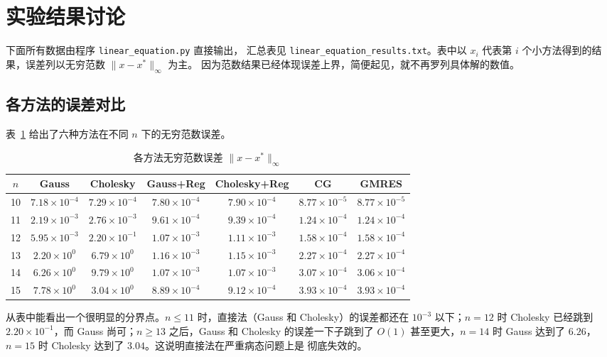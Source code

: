 \documentclass[UTF8]{ctexart}
\begin{document}
\section{实验结果讨论}

下面所有数据由程序 \texttt{linear\_equation.py} 直接输出，
汇总表见 \texttt{linear\_equation\_results.txt}。表中以 $x_i$ 代表第 $i$
个小方法得到的结果，误差列以无穷范数 $\|x-x^*\|_\infty$ 为主。
因为范数结果已经体现误差上界，简便起见，就不再罗列具体解的数值。

\subsection{各方法的误差对比}

表~\ref{tab:err} 给出了六种方法在不同 $n$ 下的无穷范数误差。

\begin{table}[H]
\centering
\small
\caption{各方法无穷范数误差 $\|x-x^*\|_\infty$}
\label{tab:err}
\begin{tabular}{c|cccccc}
\toprule
$n$ & Gauss & Cholesky & Gauss+Reg & Cholesky+Reg & CG & GMRES \\
\midrule
10 & $7.18\times 10^{-4}$ & $7.29\times 10^{-4}$ & $7.80\times 10^{-4}$ & $7.90\times 10^{-4}$ & $8.77\times 10^{-5}$ & $8.77\times 10^{-5}$ \\
11 & $2.19\times 10^{-3}$ & $2.76\times 10^{-3}$ & $9.61\times 10^{-4}$ & $9.39\times 10^{-4}$ & $1.24\times 10^{-4}$ & $1.24\times 10^{-4}$ \\
12 & $5.95\times 10^{-3}$ & $2.20\times 10^{-1}$ & $1.07\times 10^{-3}$ & $1.11\times 10^{-3}$ & $1.58\times 10^{-4}$ & $1.58\times 10^{-4}$ \\
13 & $2.20\times 10^{0}$  & $6.79\times 10^{0}$  & $1.16\times 10^{-3}$ & $1.15\times 10^{-3}$ & $2.27\times 10^{-4}$ & $2.27\times 10^{-4}$ \\
14 & $6.26\times 10^{0}$  & $9.79\times 10^{0}$  & $1.07\times 10^{-3}$ & $1.07\times 10^{-3}$ & $3.07\times 10^{-4}$ & $3.06\times 10^{-4}$ \\
15 & $7.78\times 10^{0}$  & $3.04\times 10^{0}$  & $8.89\times 10^{-4}$ & $9.12\times 10^{-4}$ & $3.93\times 10^{-4}$ & $3.93\times 10^{-4}$ \\
\bottomrule
\end{tabular}
\end{table}

从表中能看出一个很明显的分界点。$n\le 11$ 时，直接法（Gauss 和
Cholesky）的误差都还在 $10^{-3}$ 以下；$n=12$ 时 Cholesky 已经跳到
$2.20\times 10^{-1}$，而 Gauss 尚可；$n\ge 13$ 之后，Gauss 和 Cholesky
的误差一下子跳到了 $O(1)$ 甚至更大，$n=14$ 时 Gauss 达到了 $6.26$，
$n=15$ 时 Cholesky 达到了 $3.04$。这说明直接法在严重病态问题上是
彻底失效的。
\end{document}
